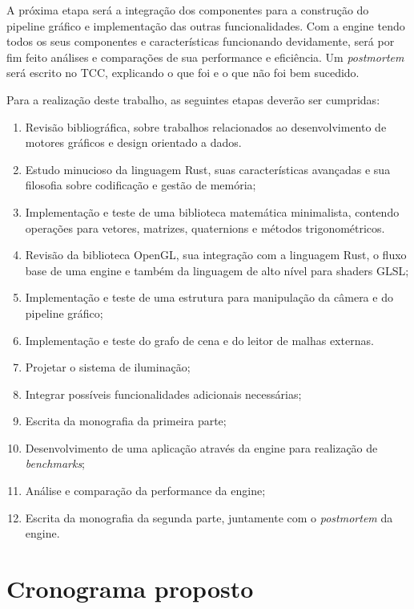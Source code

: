 \documentclass[11pt]{article}
\begin{document}
A próxima etapa será a integração dos componentes para a construção do pipeline gráfico e implementação 
das outras funcionalidades. Com a engine tendo todos os seus componentes e características funcionando devidamente,
será por fim feito análises e comparações de sua performance e eficiência. Um \textit{postmortem} será escrito no 
TCC, explicando o que foi e o que não foi bem sucedido.

Para a realização deste trabalho, as seguintes etapas deverão ser cumpridas:

\begin{enumerate}[label=\textnormal{(\arabic*)}]
    \item Revisão bibliográfica, sobre trabalhos relacionados ao desenvolvimento de motores gráficos e design 
        orientado a dados.
    \item Estudo minucioso da linguagem Rust, suas características avançadas e sua filosofia sobre 
        codificação e gestão de memória;
    \item Implementação e teste de uma biblioteca matemática minimalista, contendo operações para vetores, 
        matrizes, quaternions e métodos trigonométricos.
    \item Revisão da biblioteca OpenGL, sua integração com a linguagem Rust, o fluxo base de uma 
        engine e também da linguagem de alto nível para shaders GLSL;
    \item Implementação e teste de uma estrutura para manipulação da câmera e do pipeline gráfico;
    \item Implementação e teste do grafo de cena e do leitor de malhas externas.
    \item Projetar o sistema de iluminação;
    \item Integrar possíveis funcionalidades adicionais necessárias;
    \item Escrita da monografia da primeira parte;
    \item Desenvolvimento de uma aplicação através da engine para realização de \textit{benchmarks};
    \item Análise e comparação da performance da engine;
    \item Escrita da monografia da segunda parte, juntamente com o \textit{postmortem} da engine.
\end{enumerate}

\section{Cronograma proposto}
\label{cro}
\end{document}
